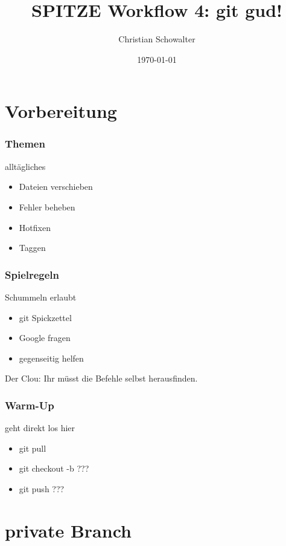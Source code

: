 \documentclass{beamer}
\title{SPITZE Workflow 4: git gud!}
\author{Christian Schowalter}
\date{\today}
\begin{document}
\maketitle

\section{Vorbereitung}

\begin{frame}
	\frametitle{Themen}
	\begin{block}{alltägliches}
		\begin{itemize}
			\item Dateien verschieben
			\item Fehler beheben 
			\item Hotfixen
			\item Taggen
		\end{itemize}
	\end{block}
\end{frame}

\begin{frame}
	\frametitle{Spielregeln}
	\begin{block}{Schummeln erlaubt}
		\begin{itemize}
			\item git Spickzettel 
			\item Google fragen
			\item gegenseitig helfen
		\end{itemize}
	\end{block}
	\pause
	Der Clou: Ihr müsst die Befehle selbst herausfinden.
\end{frame}


\begin{frame}
	\frametitle{Warm-Up}
	\begin{block}{geht direkt los hier}
		\begin{itemize}
			\item git pull
			\item git checkout -b ???
			\item git push ???
		\end{itemize}
	\end{block}
\end{frame}

\section{private Branch}
\end{document}
